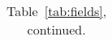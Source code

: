 \begin{table}
\begin{center}
\begin{tabular}{|c|c|c|c|c|c|}
\end{tabular} \end{center}
\caption*{Table~\ref{tab:fields}, continued.} 
\vspace{0.5in}
\end{table}

\clearpage

